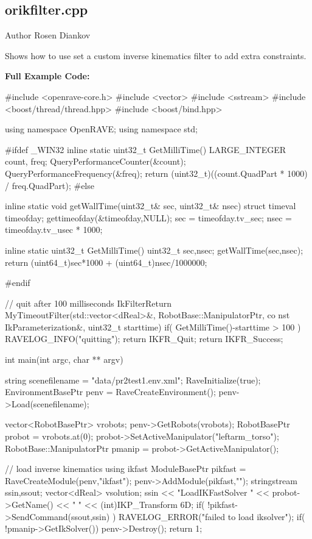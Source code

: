 \hypertarget{orikfilter.cpp-example}{
\subsection{orikfilter.cpp}
}
\begin{DoxyAuthor}{Author}
Rosen Diankov
\end{DoxyAuthor}
Shows how to use set a custom inverse kinematics filter to add extra constraints.

{\bfseries Full Example Code:}


\begin{DoxyCodeInclude}

#include <openrave-core.h>
#include <vector>
#include <sstream>
#include <boost/thread/thread.hpp>
#include <boost/bind.hpp>

using namespace OpenRAVE;
using namespace std;

#ifdef _WIN32
inline static uint32_t GetMilliTime()
{
    LARGE_INTEGER count, freq;
    QueryPerformanceCounter(&count);
    QueryPerformanceFrequency(&freq);
    return (uint32_t)((count.QuadPart * 1000) / freq.QuadPart);
}
#else

inline static void getWallTime(uint32_t& sec, uint32_t& nsec)
{
    struct timeval timeofday;
    gettimeofday(&timeofday,NULL);
    sec  = timeofday.tv_sec;
    nsec = timeofday.tv_usec * 1000;
}

inline static uint32_t GetMilliTime()
{
    uint32_t sec,nsec;
    getWallTime(sec,nsec);
    return (uint64_t)sec*1000 + (uint64_t)nsec/1000000;
}

#endif

// quit after 100 milliseconds
IkFilterReturn MyTimeoutFilter(std::vector<dReal>&, RobotBase::ManipulatorPtr, co
      nst IkParameterization&, uint32_t starttime)
{
    if( GetMilliTime()-starttime > 100 ) {
        RAVELOG_INFO("quitting\n");
        return IKFR_Quit;
    }
    return IKFR_Success;
}

int main(int argc, char ** argv)
{
    string scenefilename = "data/pr2test1.env.xml";
    RaveInitialize(true);
    EnvironmentBasePtr penv = RaveCreateEnvironment();
    penv->Load(scenefilename);

    vector<RobotBasePtr> vrobots;
    penv->GetRobots(vrobots);
    RobotBasePtr probot = vrobots.at(0);
    probot->SetActiveManipulator("leftarm_torso");
    RobotBase::ManipulatorPtr pmanip = probot->GetActiveManipulator();

    // load inverse kinematics using ikfast
    ModuleBasePtr pikfast = RaveCreateModule(penv,"ikfast");
    penv->AddModule(pikfast,"");
    stringstream ssin,ssout;
    vector<dReal> vsolution;
    ssin << "LoadIKFastSolver " << probot->GetName() << " " << (int)IKP_Transform
      6D;
    if( !pikfast->SendCommand(ssout,ssin) ) {
        RAVELOG_ERROR("failed to load iksolver\n");
    }
    if( !pmanip->GetIkSolver()) {
        penv->Destroy();
        return 1;
    }

}
\end{DoxyCodeInclude}
